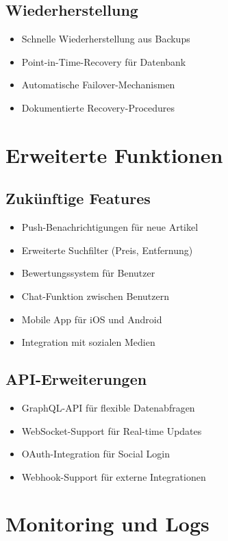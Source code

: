 \documentclass[a4paper,12pt]{article}
\begin{document}
\subsection{Wiederherstellung}
\begin{itemize}
    \item Schnelle Wiederherstellung aus Backups
    \item Point-in-Time-Recovery für Datenbank
    \item Automatische Failover-Mechanismen
    \item Dokumentierte Recovery-Procedures
\end{itemize}

\section{Erweiterte Funktionen}

\subsection{Zukünftige Features}
\begin{itemize}
    \item Push-Benachrichtigungen für neue Artikel
    \item Erweiterte Suchfilter (Preis, Entfernung)
    \item Bewertungssystem für Benutzer
    \item Chat-Funktion zwischen Benutzern
    \item Mobile App für iOS und Android
    \item Integration mit sozialen Medien
\end{itemize}

\subsection{API-Erweiterungen}
\begin{itemize}
    \item GraphQL-API für flexible Datenabfragen
    \item WebSocket-Support für Real-time Updates
    \item OAuth-Integration für Social Login
    \item Webhook-Support für externe Integrationen
\end{itemize}

\section{Monitoring und Logs}
\end{document}
